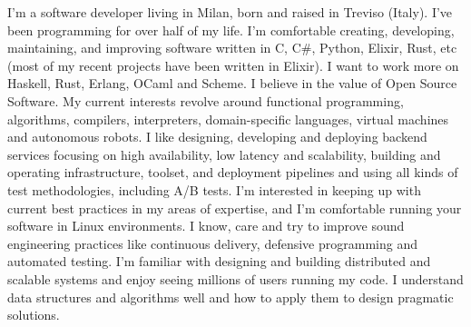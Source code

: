 \documentclass[9pt]{developercv}
\begin{document}
\begin{minipage}[t]{1.0\textwidth}
	\vspace{-\baselineskip}
	I'm a software developer living in Milan, born and raised in Treviso (Italy). I've been programming for over half of my life. I'm comfortable creating, developing, maintaining, and improving software written in C, C\#, Python, Elixir, Rust, etc (most of my recent projects have been written in Elixir). I want to work more on Haskell, Rust, Erlang, OCaml and Scheme. I believe in the value of Open Source Software. My current interests revolve around functional programming, algorithms, compilers, interpreters, domain-specific languages, virtual machines and autonomous robots. I like designing, developing and deploying backend services focusing on high availability, low latency and scalability, building and operating infrastructure, toolset, and deployment pipelines and using all kinds of test methodologies, including A/B tests. I'm interested in keeping up with current best practices in my areas of expertise, and I'm comfortable running your software in Linux environments. I know, care and try to improve sound engineering practices like continuous delivery, defensive programming and automated testing. I'm familiar with designing and building distributed and scalable systems and enjoy seeing millions of users running my code. I understand data structures and algorithms well and how to apply them to design pragmatic solutions.
\end{minipage}


\end{document}
